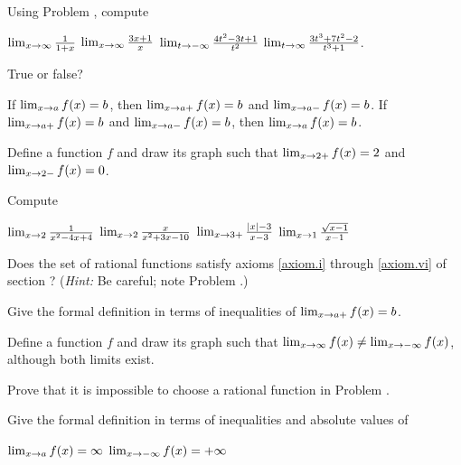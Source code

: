\begin{exercises}
Using Problem , compute
\begin{exenum}
\sx
$\lim_{x \rightarrow \infty} \frac1{1+x}$
\sx
$\lim_{x \rightarrow \infty} \frac{3x+1}x$
\sx
$\lim_{t \rightarrow -\infty} \frac{4t^2 - 3t + 1}{t^2}$
\sx
$\lim_{t \rightarrow \infty} \frac{3t^3 + 7t^2 -2}{t^3+1}$.
\end{exenum}

True or false?
\begin{exenum}
\sx
If $\lim_{x \rightarrow a} f(x)=b$, then $\lim_{x \rightarrow a+} f(x)=b$
and $\lim_{x \rightarrow a-} f(x) = b$.
\sx
If $\lim_{x \rightarrow a+} f(x)=b$ and $\lim_{x \rightarrow a-} f(x)=b$,
then $\lim_{x \rightarrow a} f(x) = b$.
\end{exenum}

Define a function $f$ and draw its graph such that 
$\lim_{x \rightarrow 2+} f(x) = 2$ and $\lim_{x \rightarrow 2-} f(x) = 0$.

Compute
\begin{exenum}
\sx
$\lim_{x \rightarrow 2} \frac1{x^2 - 4x +4}$
\sx
$\lim_{x \rightarrow 2} \frac{x}{x^2 + 3x -10}$
\sx
$\lim_{x \rightarrow 3+} \frac{|x| - 3}{x-3}$
\sx
$\lim_{x \rightarrow 1} \frac{\sqrt{x-1}}{x-1}$
\end{exenum}

Does the set of rational functions satisfy axioms \ref{axiom.i} 
through \ref{axiom.vi} of section ?
(\emph{Hint:} Be careful; note Problem .)

Give the formal definition in terms of inequalities of
$\lim_{x \rightarrow a+} f(x)=b$.

Define a function $f$ and draw its graph such that
$\lim_{x \rightarrow \infty} f(x) \ne \lim_{x \rightarrow -\infty} f(x)$,
although both limits exist.

Prove that it is impossible to choose a rational function in 
Problem .

Give the formal definition in terms of inequalities and absolute values of
\begin{exenum}
\sx
$\lim_{x \rightarrow a} f(x) = \infty$
\sx
$\lim_{x \rightarrow -\infty} f(x) = +\infty$
\end{exenum}

\end{exercises}
